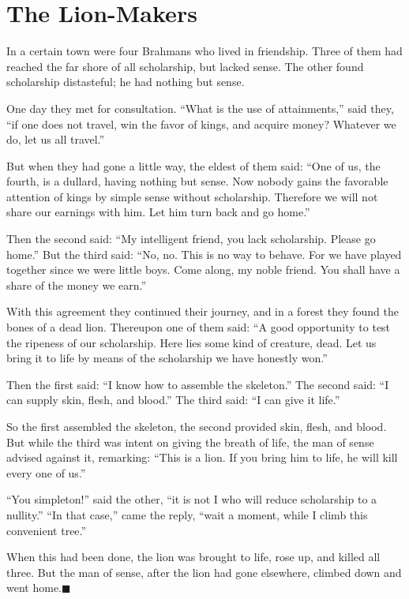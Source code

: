\documentclass[article, twoside, 14pt]{memoir}
\newcommand{\qed}{\hfill \ensuremath{\blacksquare}}
\begin{document}
\chapter{The Lion-Makers}

\label{s82}

In a certain town were four Brahmans who lived in friendship. Three
of them had reached the far shore of all scholarship, but lacked
sense. The other found scholarship distasteful; he had nothing but
sense.

One day they met for consultation.
``What is the use of attainments,'' said they,
``if one does not travel, win the favor of kings, and acquire money? Whatever we do, let us all travel.''

But when they had gone a little way, the eldest of them said:
``One of us, the fourth, is a dullard, having nothing but sense. Now nobody gains the favorable attention of kings by simple sense without scholarship. Therefore we will not share our earnings with him. Let him turn back and go home.''

Then the second said:
``My intelligent friend, you lack scholarship. Please go home.''
But the third said:
``No, no. This is no way to behave. For we have played together since we were little boys. Come along, my noble friend. You shall have a share of the money we earn.''

With this agreement they continued their journey, and in a forest
they found the bones of a dead lion. Thereupon one of them said:
``A good opportunity to test the ripeness of our scholarship. Here lies some kind of creature, dead. Let us bring it to life by means of the scholarship we have honestly won.''

Then the first said: ``I know how to assemble the skeleton.'' The
second said: ``I can supply skin, flesh, and blood.'' The third
said: ``I can give it life.''

So the first assembled the skeleton, the second provided skin,
flesh, and blood. But while the third was intent on giving the
breath of life, the man of sense advised against it, remarking:
``This is a lion. If you bring him to life, he will kill every one of us.''

``You simpleton!'' said the other,
``it is not I who will reduce scholarship to a nullity.''
``In that case,'' came the reply,
``wait a moment, while I climb this convenient tree.''

When this had been done, the lion was brought to life, rose up, and
killed all three. But the man of sense, after the lion had gone
elsewhere, climbed down and went home.\hyperref[s82]{\qed}
\end{document}

